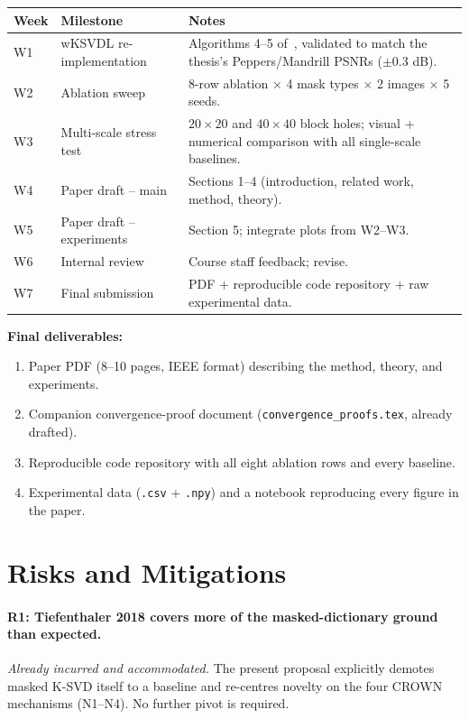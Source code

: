 \documentclass[11pt,a4paper]{article}
\theoremstyle{definition}
\theoremstyle{remark}
\begin{document}
\begin{center}
\small
\begin{tabular}{@{}llp{8.5cm}@{}}
\toprule
Week & Milestone & Notes \\
\midrule
W1   & wKSVDL re-implementation & Algorithms 4--5 of~\cite{tiefenthaler2018thesis}, validated to match the thesis's Peppers/Mandrill PSNRs ($\pm 0.3$ dB). \\
W2   & Ablation sweep          & 8-row ablation $\times$ 4 mask types $\times$ 2 images $\times$ 5 seeds. \\
W3   & Multi-scale stress test & $20\times 20$ and $40\times 40$ block holes; visual + numerical comparison with all single-scale baselines. \\
W4   & Paper draft -- main     & Sections 1--4 (introduction, related work, method, theory). \\
W5   & Paper draft -- experiments & Section 5; integrate plots from W2--W3. \\
W6   & Internal review         & Course staff feedback; revise. \\
W7   & Final submission        & PDF + reproducible code repository + raw experimental data. \\
\bottomrule
\end{tabular}
\end{center}

\noindent\textbf{Final deliverables:}
\begin{enumerate}[label=\textbf{D\arabic*.},leftmargin=2.6em,itemsep=2pt]
\item Paper PDF (8--10 pages, IEEE format) describing the method,
  theory, and experiments.
\item Companion convergence-proof document
  (\texttt{convergence\_proofs.tex}, already drafted).
\item Reproducible code repository with all eight ablation rows and
  every baseline.
\item Experimental data (\texttt{.csv} + \texttt{.npy}) and a
  notebook reproducing every figure in the paper.
\end{enumerate}

\section{Risks and Mitigations}

\paragraph{R1: Tiefenthaler 2018 covers more of the masked-dictionary
ground than expected.}
\emph{Already incurred and accommodated.} The present proposal
explicitly demotes masked K-SVD itself to a baseline and re-centres
novelty on the four CROWN mechanisms (N1--N4). No further pivot is
required.
\end{document}

